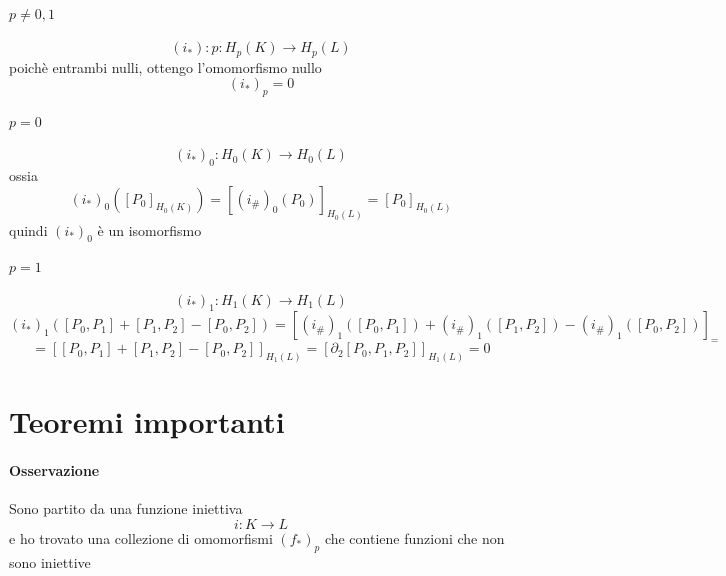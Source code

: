 \documentclass[a4paper]{report}
\newcommand{\ra}{\ensuremath{\rightarrow}}
\begin{document}
\paragraph{$p\neq 0,1$}
\[
    (i_*):p:H_p(K)\ra H_p(L)
\]
poichè entrambi nulli, ottengo l'omomorfismo nullo
\[
    (i_*)_p=0
\]
\paragraph{$p=0$}
\[
    (i_*)_0:H_0(K)\ra H_0(L)
\]
ossia
\[
    (i_*)_0([P_0]_{H_0(K)})=\left[(i_\#)_0(P_0)\right]_{H_0(L)}=\left[P_0\right]_{H_0(L)}
\]
quindi $(i_*)_0$ è un isomorfismo
\paragraph{$p=1$}
\[
    (i_*)_1:H_1(K)\ra H_1(L)
\]
\[
    (i_*)_1([P_0,P_1]+[P_1,P_2]-[P_0,P_2])=[(i_\#)_1([P_0,P_1])+(i_\#)_1([P_1,P_2])-(i_\#)_1([P_0,P_2])]_=
\]
\[
    =[[P_0,P_1]+[P_1,P_2]-[P_0,P_2]]_{H_1(L)}=[\partial_2[P_0,P_1,P_2]]_{H_1(L)}=0
\]
\section{Teoremi importanti}
\paragraph{Osservazione}
Sono partito da una funzione iniettiva
\[
    i:K\ra L
\]
e ho trovato una collezione di omomorfismi ${(f_*)_p}$ che contiene funzioni che non sono iniettive
\end{document}
